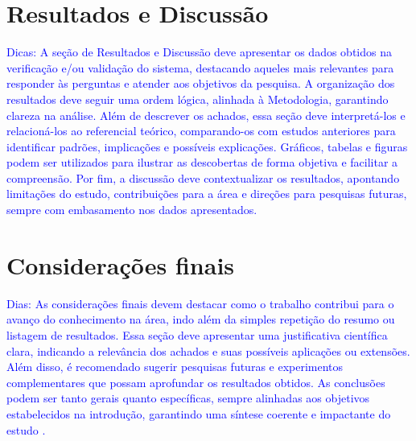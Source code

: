 \documentclass[
	article,			%
	11pt,				%
	oneside,			%
	a4paper,			%
	english,			%
	brazil,				%
	sumario=tradicional
]{abntex2}
\begin{document}
\section{Resultados e Discussão}

\textcolor{blue}{
Dicas: A seção de Resultados e Discussão deve apresentar os dados obtidos na
verificação e/ou validação do sistema, destacando aqueles mais relevantes para
responder às perguntas e atender aos objetivos da pesquisa. A organização dos
resultados deve seguir uma ordem lógica, alinhada à Metodologia, garantindo
clareza na análise. Além de descrever os achados, essa seção deve interpretá-los
e relacioná-los ao referencial teórico, comparando-os com estudos anteriores
para identificar padrões, implicações e possíveis explicações. Gráficos, tabelas
e figuras podem ser utilizados para ilustrar as descobertas de forma objetiva e
facilitar a compreensão. Por fim, a discussão deve contextualizar os resultados,
apontando limitações do estudo, contribuições para a área e direções para
pesquisas futuras, sempre com embasamento nos dados apresentados.
}

\section{Considerações finais}

\textcolor{blue}{
Dias: As considerações finais devem destacar como o trabalho contribui para o
avanço do conhecimento na área, indo além da simples repetição do resumo ou
listagem de resultados. Essa seção deve apresentar uma justificativa científica
clara, indicando a relevância dos achados e suas possíveis aplicações ou
extensões. Além disso, é recomendado sugerir pesquisas futuras e experimentos
complementares que possam aprofundar os resultados obtidos. As conclusões podem
ser tanto gerais quanto específicas, sempre alinhadas aos objetivos
estabelecidos na introdução, garantindo uma síntese coerente e impactante do
estudo \cite{Elsevier2025}.
}

\renewcommand{\bibname}{
    \raggedright Referências\vspace{-1.5em}
}

\end{document}
